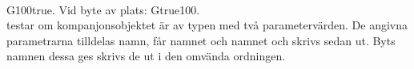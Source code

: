 

%

\SOLUTION


\TaskSolved \what \\
G100true. Vid byte av plats: Gtrue100.\\
 testar om kompanjonsobjektet  är av typen  med två parametervärden. De angivna parametrarna tilldelas namn,  får namnet  och  namnet  och skrivs sedan ut. Byts namnen dessa ges skrivs de ut i den omvända ordningen.






